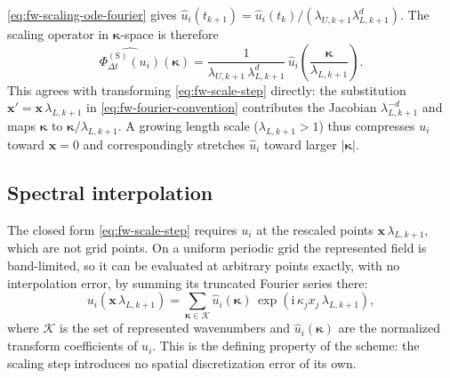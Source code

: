 \documentclass{article}
\begin{document}
\eqref{eq:fw-scaling-ode-fourier} gives
$\hat{u}_i(t_{k+1}) = \hat{u}_i(t_k) / (\lambda_{U,k+1} \lambda_{L,k+1}^{d})$.
The scaling operator in $\boldsymbol{\kappa}$-space is therefore
\begin{equation}\label{eq:fw-scale-step-fourier}
  \widehat{\Phi_{\Delta t}^{(\mathrm{S})}(u_i)}(\boldsymbol{\kappa})
  = \frac{1}{\lambda_{U,k+1}\, \lambda_{L,k+1}^{d}}\,
    \hat{u}_i\!\left( \frac{\boldsymbol{\kappa}}{\lambda_{L,k+1}} \right).
\end{equation}
This agrees with transforming \eqref{eq:fw-scale-step} directly: the
substitution $\mathbf{x}' = \mathbf{x}\, \lambda_{L,k+1}$ in
\eqref{eq:fw-fourier-convention} contributes the Jacobian
$\lambda_{L,k+1}^{-d}$ and maps $\boldsymbol{\kappa}$ to $\boldsymbol{\kappa} / \lambda_{L,k+1}$.
A growing length scale ($\lambda_{L,k+1} > 1$) thus compresses $u_i$ toward
$\mathbf{x} = 0$ and correspondingly stretches $\hat{u}_i$ toward larger
$|\boldsymbol{\kappa}|$.

\subsection{Spectral interpolation}\label{ssec:fw-interpolation}

The closed form \eqref{eq:fw-scale-step} requires $u_i$ at the rescaled points
$\mathbf{x}\,\lambda_{L,k+1}$, which are not grid points. On a uniform
periodic grid the represented field is band-limited, so it can be evaluated at
arbitrary points exactly, with no interpolation error, by summing its
truncated Fourier series there:
\begin{equation}\label{eq:fw-spectral-interp}
  u_i\!\left(\mathbf{x}\, \lambda_{L,k+1}\right)
  = \sum_{\boldsymbol{\kappa} \in \mathcal{K}} \hat{u}_i(\boldsymbol{\kappa})\,
    \exp\!\left( \mathrm{i}\, \kappa_j x_j\, \lambda_{L,k+1} \right),
\end{equation}
where $\mathcal{K}$ is the set of represented wavenumbers and
$\hat{u}_i(\boldsymbol{\kappa})$ are the normalized transform coefficients of $u_i$.
This is the defining property of the scheme: the scaling step introduces no
spatial discretization error of its own.
\end{document}
